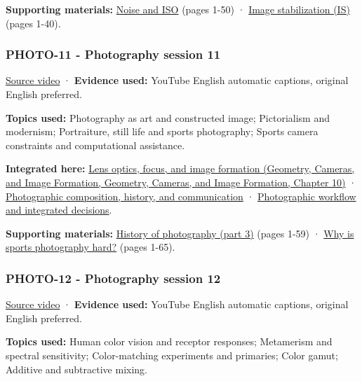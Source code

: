 \textbf{Supporting materials:} \href{https://drive.google.com/open?id=0B6w2XfPHEcZYS2xETmR4SVlIczg}{Noise and ISO} (pages 1-50) · \href{https://drive.google.com/open?id=0B6w2XfPHEcZYcFpESFU4dEM3QkE}{Image stabilization (IS)} (pages 1-40).

\subsubsection{PHOTO-11 - Photography session 11}\label{04-visual-computing-ii-ch036-photo-11---photography-session-11}

\href{https://www.youtube.com/watch?v=AaJz5RMtO4c}{Source video} · \textbf{Evidence used:} YouTube English automatic captions, original English preferred.

\textbf{Topics used:} Photography as art and constructed image; Pictorialism and modernism; Portraiture, still life and sports photography; Sports camera constraints and computational assistance.

\textbf{Integrated here:} \href{../03-Geometry-Cameras-and-Image-Formation/main.pdf\#nameddest=03-visual-computing-i-ch003-lens-optics-focus-and-image-formation}{Lens optics, focus, and image formation (Geometry, Cameras, and Image Formation, Geometry, Cameras, and Image Formation, Chapter 10)} · \hyperref[04-visual-computing-ii-ch034-photographic-composition-history-and-communication]{Photographic composition, history, and communication} · \hyperref[04-visual-computing-ii-ch034-photographic-workflow-and-integrated-decisions]{Photographic workflow and integrated decisions}.

\textbf{Supporting materials:} \href{https://drive.google.com/open?id=0B6w2XfPHEcZYU1hzN1BtalBqQ1U}{History of photography (part 3)} (pages 1-59) · \href{https://drive.google.com/open?id=0B6w2XfPHEcZYc1BpLTNjZGUzbk0}{Why is sports photography hard?} (pages 1-65).

\subsubsection{PHOTO-12 - Photography session 12}\label{04-visual-computing-ii-ch036-photo-12---photography-session-12}

\href{https://www.youtube.com/watch?v=gRT0mtabjI4}{Source video} · \textbf{Evidence used:} YouTube English automatic captions, original English preferred.

\textbf{Topics used:} Human color vision and receptor responses; Metamerism and spectral sensitivity; Color-matching experiments and primaries; Color gamut; Additive and subtractive mixing.

